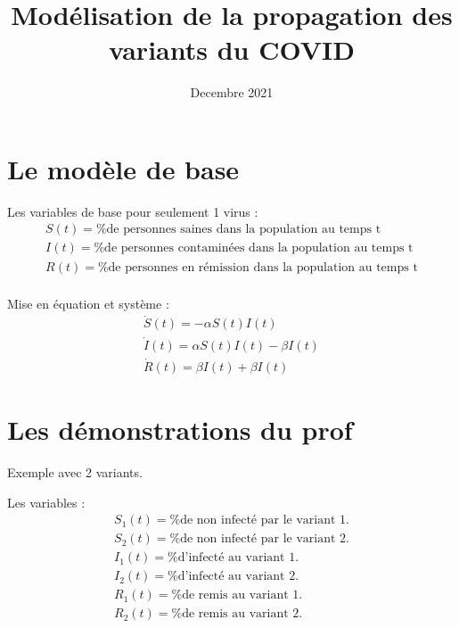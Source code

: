 \documentclass{article}
\title{Modélisation de la propagation des variants du COVID}
\author{}
\date{Decembre 2021}
\begin{document}
\maketitle

\section{Le modèle de base}

Les variables de base pour seulement 1 virus : 
\begin{align}
    S(t)= \text{\% de personnes saines dans la population au temps t} \\
    I(t)= \text{\% de personnes contaminées dans la population au temps t} \\
    R(t)= \text{\% de personnes en rémission dans la population au temps t} \\
\end{align}

Mise en équation et système : 
\begin{align}
    \dot{S}(t)= -\alpha S(t)I(t) \\
    \dot{I}(t)= \alpha S(t)I(t)-\beta I(t) \\
    \dot{R}(t)= \beta I(t) + \beta I(t)
\end{align}

\section{Les démonstrations du prof}

Exemple avec 2 variants.

Les variables : 
\begin{align}
    S_1(t)= \text{\% de non infecté par le variant 1.} \\
    S_2(t)= \text{\% de non infecté par le variant 2.} \\
    I_1(t)= \text{\% d'infecté au variant 1.} \\
    I_2(t)= \text{\% d'infecté au variant 2.} \\
    R_1(t)= \text{\% de remis au variant 1.} \\
    R_2(t)= \text{\% de remis au variant 2.} \\
\end{align}
\end{document}
